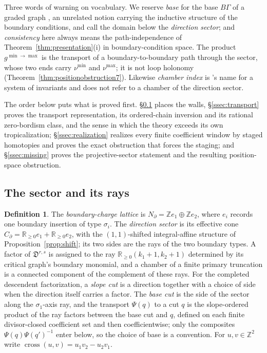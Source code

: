 \documentclass[11pt]{amsart}
\theoremstyle{definition}
\newtheorem{definition}[theorem]{Definition}
\theoremstyle{remark}
\newcommand{\ZZ}{\mathbb{Z}}
\newcommand{\RR}{\mathbb{R}}
\newcommand{\Dscr}{\mathfrak{D}}
\begin{document}
Three words of warning on vocabulary. We reserve
\emph{base} for the base $B\Gamma$ of a graded graph \cite[Def.~3.5]{GKT}, an
unrelated notion carrying the inductive structure of the boundary conditions, and
call the domain below the \emph{direction sector}; and \emph{consistency} here
always means the path-independence of Theorem~\ref{thm:presentation}(i) in
boundary-condition space.  The product $g^{\min\to\max}$ is the transport of a
boundary-to-boundary path through the sector, whose two ends carry $\nu^{\min}$ and
$\nu^{\max}$; it is not loop holonomy
(Theorem~\ref{thm:positionobstruction7}).  Likewise \emph{chamber index} is
\cite{GKT}'s name for a system of invariants and does not refer to a chamber
of the direction sector.

The order below puts what is proved first. \S\ref{ssec:sector} places the walls,
\S\ref{ssec:transport} proves the transport representation, its ordered-chain
inversion and its rational zero-bordism class, and the sense in which the
theory exceeds its own tropicalization; \S\ref{ssec:realization} realizes every
finite coefficient window by staged homotopies and proves the exact obstruction
that forces the staging; and \S\ref{ssec:missing} proves the projective-sector
statement and the resulting position-space obstruction.

\subsection{The sector and its rays}
\label{ssec:sector}
\begin{definition}
\label{def:sector}
The \emph{boundary-charge lattice} is
$N_{\partial}=\ZZ e_{1}\oplus\ZZ e_{2}$, where $e_i$ records one boundary
insertion of type $\sigma_i$.  The \emph{direction sector} is its effective cone
$C_{\partial}=\RR_{\ge0}e_1+\RR_{\ge0}e_2$, with the $(1,1)$-shifted
integral-affine structure of Proposition~\ref{prop:shift}; its two sides are the
rays of the two boundary types. A factor of $\Dscr^{r,s}$ is assigned to the
ray $\RR_{\ge0}(k_{1}{+}1,k_{2}{+}1)$ determined by its critical graph's
boundary monomial, and a chamber of a finite primary truncation is a connected
component of the complement of these rays. For the completed descendent
factorization, a \emph{slope cut} is a direction together with a choice of side
when the direction itself carries a factor. The \emph{base cut} is the side of the sector along the
$\sigma_{1}$-axis ray, and the transport $\Psi(q)$ to a cut $q$ is the
slope-ordered product of the ray
factors between the base cut and $q$, defined on each finite divisor-closed
coefficient set and
then coefficientwise; only the composites $\Psi(q)\Psi(q')^{-1}$ enter below,
so the choice of base is a convention. For $u,v\in\ZZ^{2}$ write
$\operatorname{cross}(u,v)=u_{1}v_{2}-u_{2}v_{1}$.
\end{definition}
\end{document}
